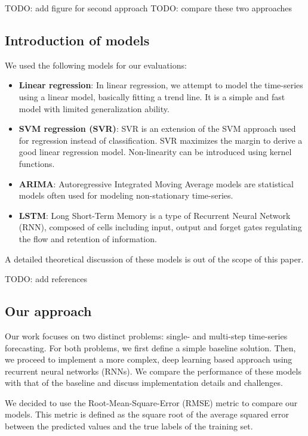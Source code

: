 \documentclass{article}
\begin{document}
TODO: add figure for second approach
TODO: compare these two approaches


\subsection{Introduction of models}

We used the following models for our evaluations:

\begin{itemize}
	\item \textbf{Linear regression}: In linear regression, we attempt to model the time-series using a linear model, basically fitting a trend line. It is a simple and fast model with limited generalization ability.
	\item \textbf{SVM regression (SVR)}: SVR is an extension of the SVM approach used for regression instead of classification. SVR maximizes the margin to derive a good linear regression model. Non-linearity can be introduced using kernel functions.
	\item \textbf{ARIMA}: Autoregressive Integrated Moving Average models are statistical models often used for modeling non-stationary time-series. 
	\item \textbf{LSTM}: Long Short-Term Memory is a type of Recurrent Neural Network (RNN), composed of cells including input, output and forget gates regulating the flow and retention of information.
\end{itemize}

A detailed theoretical discussion of these models is out of the scope of this paper.

TODO: add references

\subsection{Our approach}

Our work focuses on two distinct problems: single- and multi-step time-series forecasting. For both problems, we first define a simple baseline solution. Then, we proceed to implement a more complex, deep learning based approach using recurrent neural networks (RNNs). We compare the performance of these models with that of the baseline and discuss implementation details and challenges.

We decided to use the Root-Mean-Square-Error (RMSE) metric to compare our models. This metric is defined as the square root of the average squared error between the predicted values and the true labels of the training set.
\end{document}
